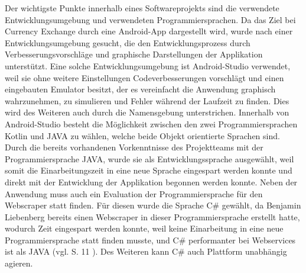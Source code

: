 \documentclass[conference]{IEEEtran}
\begin{document}
Der wichtigste Punkte innerhalb eines Softwareprojekts sind die verwendete Entwicklungsumgebung und verwendeten Programmiersprachen. Da das Ziel bei Currency Exchange durch eine Android-App dargestellt wird, wurde nach einer Entwicklungsumgebung gesucht, die den Entwicklungsprozess durch Verbesserungsvorschläge und graphische Darstellungen der Applikation unterstützt. Eine solche Entwicklungsumgebung ist Android-Studio verwendet, weil sie ohne weitere Einstellungen Codeverbesserungen vorschlägt und einen eingebauten Emulator besitzt, der es vereinfacht die Anwendung graphisch wahrzunehmen, zu simulieren und Fehler während der Laufzeit zu finden. Dies wird des Weiteren auch durch die Namensgebung unterstrichen. Innerhalb von Android-Studio besteht die Möglichkeit zwischen den zwei Programmiersprachen Kotlin und JAVA zu wählen, welche beide Objekt orientierte Sprachen sind. Durch die bereits vorhandenen Vorkenntnisse des Projektteams mit der Programmiersprache JAVA, wurde sie als Entwicklungssprache ausgewählt, weil somit die Einarbeitungszeit in eine neue Sprache eingespart werden konnte und direkt mit der Entwicklung der Applikation begonnen werden konnte. Neben der Anwendung muss auch ein Evaluation der Programmiersprache für den Webscraper statt finden. Für diesen wurde die Sprache C\# gewählt, da Benjamin Liebenberg bereits einen Webscraper in dieser Programmiersprache erstellt hatte, wodurch Zeit eingespart werden konnte, weil keine Einarbeitung in eine neue Programmiersprache statt finden musste, und C\# performanter bei Webservices ist als JAVA (vgl. S. 11 \cite{csharpperformance}). Des Weiteren kann C\# auch Plattform unabhängig agieren.
\end{document}
